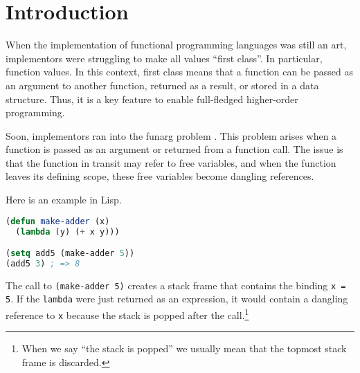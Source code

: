 \documentclass[sigplan,review,dvipsnames,screen,10pt]{acmart}
\begin{document}


\maketitle
{}

\section{Introduction}

When the implementation of functional programming languages was still
an art, implementors were struggling to make all values ``first
class''. In particular, function values. In this context, first
class means that a function can be passed as an argument to another
function, returned as a result, or stored in a data structure. Thus,
it is a key feature to enable full-fledged higher-order programming.

Soon, implementors ran into the funarg problem \cite{moses70:_funct_lisp_funar}. This problem arises
when a function is passed as an argument or returned from a function
call. The issue is that the function in transit may refer to free
variables, and when the function leaves its defining scope, these free
variables become dangling references. 

Here is an example in Lisp.
\begin{lstlisting}[language=lisp]
(defun make-adder (x)
  (lambda (y) (+ x y)))

(setq add5 (make-adder 5))
(add5 3) ; => 8
\end{lstlisting}
The call to \lstinline|(make-adder 5)| creates a stack frame that
contains the binding \texttt{x = 5}. If the \lstinline|lambda| were just
returned as an expression, it would contain a dangling reference to
\texttt{x} because the stack is popped after the call.\footnote{When
  we say ``the stack is popped'' we usually mean that the topmost
  stack frame is discarded.}
\end{document}
